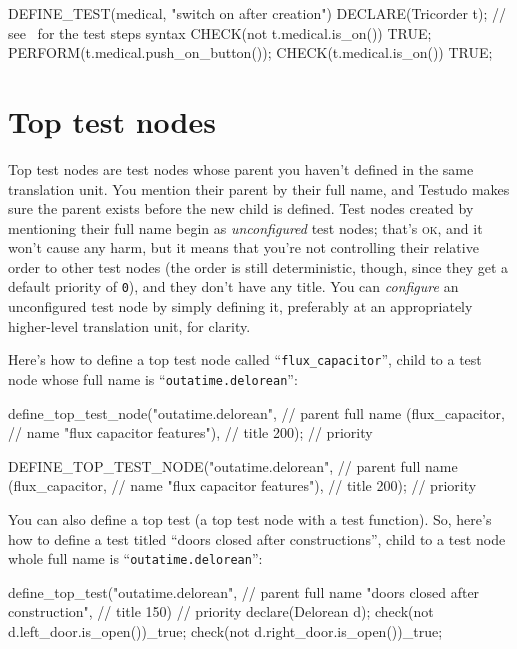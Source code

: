 \documentclass[twoside, a4paper, article]{memoir}
\begin{document}
\begin{cpplisting}
DEFINE_TEST(medical, "switch on after creation")
{
  DECLARE(Tricorder t); // see~ for the test steps syntax
  CHECK(not t.medical.is_on()) TRUE;
  PERFORM(t.medical.push_on_button());
  CHECK(t.medical.is_on()) TRUE;
}
\end{cpplisting}

\section{Top test nodes}
\label{sec:top-test-nodes}

Top test nodes are test nodes whose parent you haven't defined in the same
translation unit.  You mention their parent by their full name, and Testudo
makes sure the parent exists before the new child is defined.  Test nodes
created by mentioning their full name begin as \emph{unconfigured} test nodes;
that's \textsc{ok}, and it won't cause any harm, but it means that you're not
controlling their relative order to other test nodes (the order is still
deterministic, though, since they get a default priority of \texttt{0}), and
they don't have any title.  You can \emph{configure} an unconfigured test node
by simply defining it, preferably at an appropriately higher-level translation
unit, for clarity.

Here's how to define a top test node called ``\texttt{flux\_capacitor}'', child
to a test node whose full name is ``\texttt{outatime.delorean}'':
\begin{cpplisting}
define_top_test_node("outatime.delorean", // parent full name
                     (flux_capacitor, // name
                      "flux capacitor features"), // title
                     200); // priority
\end{cpplisting}

\begin{cpplisting}
DEFINE_TOP_TEST_NODE("outatime.delorean", // parent full name
                     (flux_capacitor, // name
                      "flux capacitor features"), // title
                     200); // priority
\end{cpplisting}

You can also define a top test (a top test node with a test function).  So,
here's how to define a test titled ``doors closed after constructions'', child
to a test node whole full name is ``\texttt{outatime.delorean}'':
\begin{cpplisting}
define_top_test("outatime.delorean", // parent full name
                "doors closed after construction", // title
                150) { // priority
  declare(Delorean d);
  check(not d.left_door.is_open())_true;
  check(not d.right_door.is_open())_true;
}
\end{cpplisting}
\end{document}
